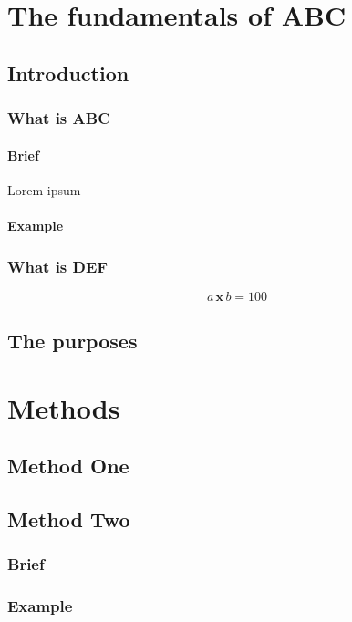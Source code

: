 \documentclass[12pt]{book}
\renewcommand{\times}{ \hspace{2pt}\textbf{x}\hspace{2pt} }
\begin{document}
\part{The fundamentals of ABC}

\chapter{Introduction}

\section{What is ABC}
\blindtext
\subsection{Brief}
Lorem ipsum
\subsection{Example}
\blindtext

\section{What is DEF}
\blindtext
\[ a \times b = 100 \]

\chapter{The purposes}
\blindtext



\part{Methods}

\chapter{Method One}
\Blindtext[2]

\chapter{Method Two}
\section{Brief}
\blindtext
\section{Example}
\blindtext
\end{document}
